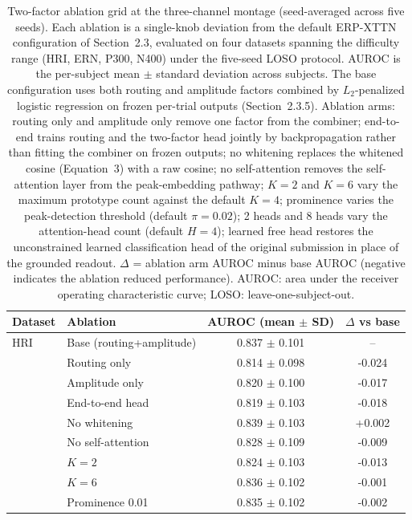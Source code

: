 \begin{table}[t]
\centering
\setlength{\tabcolsep}{6pt}
\caption{%
Two-factor ablation grid at the three-channel montage (seed-averaged across five seeds). Each ablation is a single-knob deviation from the default ERP-XTTN configuration of Section~2.3, evaluated on four datasets spanning the difficulty range (HRI, ERN, P300, N400) under the five-seed LOSO protocol. AUROC is the per-subject mean $\pm$ standard deviation across subjects. The base configuration uses both routing and amplitude factors combined by $L_2$-penalized logistic regression on frozen per-trial outputs (Section~2.3.5). Ablation arms: routing only and amplitude only remove one factor from the combiner; end-to-end trains routing and the two-factor head jointly by backpropagation rather than fitting the combiner on frozen outputs; no whitening replaces the whitened cosine (Equation~3) with a raw cosine; no self-attention removes the self-attention layer from the peak-embedding pathway; $K = 2$ and $K = 6$ vary the maximum prototype count against the default $K = 4$; prominence varies the peak-detection threshold (default $\pi = 0.02$); 2 heads and 8 heads vary the attention-head count (default $H = 4$); learned free head restores the unconstrained learned classification head of the original submission in place of the grounded readout. $\Delta$ = ablation arm AUROC minus base AUROC (negative indicates the ablation reduced performance). AUROC: area under the receiver operating characteristic curve; LOSO: leave-one-subject-out.%
}
\label{sup:tab-ablation}
\begin{tabular}{llcc}
\toprule
Dataset & Ablation & AUROC (mean $\pm$ SD) & $\Delta$ vs base \\
\midrule
HRI & Base (routing+amplitude) & 0.837 $\pm$ 0.101 & -- \\
 & Routing only & 0.814 $\pm$ 0.098 & -0.024 \\
 & Amplitude only & 0.820 $\pm$ 0.100 & -0.017 \\
 & End-to-end head & 0.819 $\pm$ 0.103 & -0.018 \\
 & No whitening & 0.839 $\pm$ 0.103 & +0.002 \\
 & No self-attention & 0.828 $\pm$ 0.109 & -0.009 \\
 & $K=2$ & 0.824 $\pm$ 0.103 & -0.013 \\
 & $K=6$ & 0.836 $\pm$ 0.102 & -0.001 \\
 & Prominence 0.01 & 0.835 $\pm$ 0.102 & -0.002 \\

\end{tabular}
\end{table}
